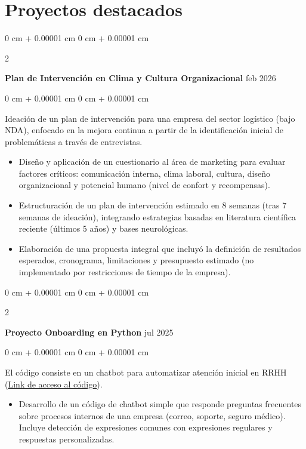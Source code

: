 \documentclass[10pt, letterpaper]{article}
\newenvironment{highlights}{
    \begin{itemize}[
        topsep=0.10 cm,
        parsep=0.10 cm,
        partopsep=0pt,
        itemsep=0pt,
        leftmargin=0 cm + 10pt
    ]
}{
    \end{itemize}
} %
\newenvironment{onecolentry}{
    \begin{adjustwidth}{
        0 cm + 0.00001 cm
    }{
        0 cm + 0.00001 cm
    }
}{
    \end{adjustwidth}
} %
\newenvironment{twocolentry}[2][]{
    \onecolentry
    \def\secondColumn{#2}
    \setcolumnwidth{\fill, 4.5 cm}
    \begin{paracol}{2}
}{
    \switchcolumn \raggedleft \secondColumn
    \end{paracol}
    \endonecolentry
} %
\let\hrefWithoutArrow\href
\begin{document}
    
    \section{Proyectos destacados}
    
            \begin{twocolentry}{
            feb 2026
        }
            \textbf{Plan de Intervención en Clima y Cultura Organizacional}\end{twocolentry}

        \vspace{0.10 cm}
        \begin{onecolentry}
        Ideación de un plan de intervención para una empresa del sector logístico (bajo NDA), enfocado en la mejora continua a partir de la identificación inicial de problemáticas a través de entrevistas.
            \begin{highlights}
                \item Diseño y aplicación de un cuestionario al área de marketing para evaluar factores críticos: comunicación interna, clima laboral, cultura, diseño organizacional y potencial humano (nivel de confort y recompensas).
                \item Estructuración de un plan de intervención estimado en 8 semanas (tras 7 semanas de ideación), integrando estrategias basadas en literatura científica reciente (últimos 5 años) y bases neurológicas.
                \item Elaboración de una propuesta integral que incluyó la definición de resultados esperados, cronograma, limitaciones y presupuesto estimado (no implementado por restricciones de tiempo de la empresa).
            \end{highlights}
        \end{onecolentry}

        \vspace{0.2 cm}

        \vspace{0.2 cm}
        
        \begin{twocolentry}{
            jul 2025
        }
            \textbf{Proyecto Onboarding en Python}\end{twocolentry}

        \vspace{0.10 cm}
        \begin{onecolentry}
        El código consiste en un chatbot para automatizar atención inicial en RRHH (\hrefWithoutArrow{https://gist.github.com/Aleinad07/d74a5e9e1651bbdcbd46172c97b253a9}{Link de acceso al código}).
         \begin{highlights}
                \item Desarrollo de un código de chatbot simple que responde preguntas frecuentes sobre procesos internos de una empresa (correo, soporte, seguro médico). Incluye detección de expresiones comunes con expresiones regulares y respuestas personalizadas. 
            \end{highlights}
        \end{onecolentry}
        
\end{document}
